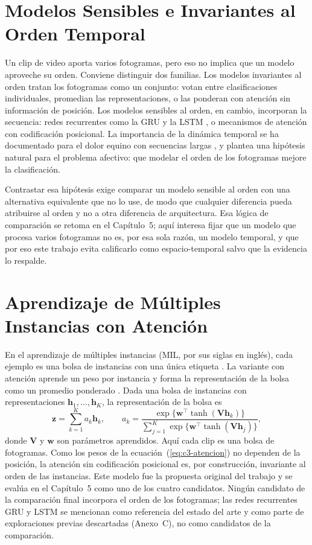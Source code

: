 \section{Modelos Sensibles e Invariantes al Orden Temporal}
Un clip de video aporta varios fotogramas, pero eso no implica que un modelo aproveche su orden. Conviene distinguir dos familias. Los modelos invariantes al orden tratan los fotogramas como un conjunto: votan entre clasificaciones individuales, promedian las representaciones, o las ponderan con atención sin información de posición. Los modelos sensibles al orden, en cambio, incorporan la secuencia: redes recurrentes como la GRU \parencite{cho2014} y la LSTM \parencite{hochreiter1997}, o mecanismos de atención con codificación posicional. La importancia de la dinámica temporal se ha documentado para el dolor equino con secuencias largas \parencite{broome2019}, y plantea una hipótesis natural para el problema afectivo: que modelar el orden de los fotogramas mejore la clasificación.

Contrastar esa hipótesis exige comparar un modelo sensible al orden con una alternativa equivalente que no lo use, de modo que cualquier diferencia pueda atribuirse al orden y no a otra diferencia de arquitectura. Esa lógica de comparación se retoma en el Capítulo~5; aquí interesa fijar que un modelo que procesa varios fotogramas no es, por esa sola razón, un modelo temporal, y que por eso este trabajo evita calificarlo como espacio-temporal salvo que la evidencia lo respalde.

\section{Aprendizaje de Múltiples Instancias con Atención}
En el aprendizaje de múltiples instancias (MIL, por sus siglas en inglés), cada ejemplo es una bolsa de instancias con una única etiqueta \parencite{dietterich1997}. La variante con atención aprende un peso por instancia y forma la representación de la bolsa como un promedio ponderado \parencite{ilse2018}. Dada una bolsa de instancias con representaciones $\mathbf{h}_1,\dots,\mathbf{h}_K$, la representación de la bolsa es
\begin{equation}
\mathbf{z} = \sum_{k=1}^{K} a_k \mathbf{h}_k, \qquad
a_k = \frac{\exp\{\mathbf{w}^{\top}\tanh(\mathbf{V}\mathbf{h}_k)\}}{\sum_{j=1}^{K}\exp\{\mathbf{w}^{\top}\tanh(\mathbf{V}\mathbf{h}_j)\}},
\label{eq:c3-atencion}
\end{equation}
donde $\mathbf{V}$ y $\mathbf{w}$ son parámetros aprendidos. Aquí cada clip es una bolsa de \Fotogramas{} fotogramas. Como los pesos de la ecuación~(\ref{eq:c3-atencion}) no dependen de la posición, la atención sin codificación posicional es, por construcción, invariante al orden de las instancias. Este modelo fue la propuesta original del trabajo y se evalúa en el Capítulo~5 como uno de los cuatro candidatos. Ningún candidato de la comparación final incorpora el orden de los fotogramas; las redes recurrentes GRU \parencite{cho2014} y LSTM \parencite{hochreiter1997} se mencionan como referencia del estado del arte y como parte de exploraciones previas descartadas (Anexo~C), no como candidatos de la comparación.

